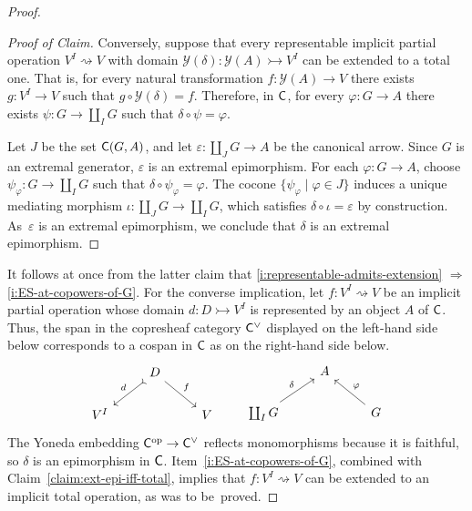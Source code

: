 \documentclass[10pt,a4paper]{amsart}
\newcommand{\CP}[1]{{#1}^{\text{\tiny$\vee$}}}			%
\newcommand{\IMP}{\Rightarrow}						%
\newcommand{\cat}{{\sf C}}								%
\renewcommand{\epsilon}{\varepsilon}
\newcommand{\op}{{\mathrm{op}}}						%
\renewcommand{\phi}{\varphi}
\newcommand{\yo}{\mathcal{Y}}
\begin{document}
\begin{proof}
\begin{proof}[Proof of Claim]
Conversely, suppose that every representable implicit partial operation $V^{I} \rightsquigarrow V$ with domain $\yo(\delta)\colon \yo(A)\rightarrowtail V^{I}$ can be extended to a total one. That is, for every natural transformation $f\colon \yo(A)\to V$ there exists $g\colon V^{I}\to V$ such that $g\circ \yo(\delta) = f$. Therefore, in $\cat$, for every $\phi\colon G\to A$ there exists $\psi\colon G\to \coprod_{I}G$ such that $\delta\circ \psi = \phi$. 

Let $J$ be the set $\cat(G,A)$, and let $\epsilon\colon \coprod_{J}G \to A$ be the canonical arrow. Since $G$ is an extremal generator, $\epsilon$ is an extremal epimorphism. For each $\phi\colon G \to A$, choose $\psi_{\phi}\colon G\to \coprod_{I}G$ such that $\delta\circ \psi_{\phi} = \phi$. The cocone $\{\psi_{\phi}\mid \phi\in J\}$ induces a unique mediating morphism $\iota\colon \coprod_{J}G \to \coprod_{I}G$, which satisfies $\delta\circ \iota = \epsilon$ by construction. As~$\epsilon$ is an extremal epimorphism, we conclude that $\delta$ is an extremal epimorphism. 
\end{proof}
%
It follows at once from the latter claim that \ref{i:representable-admits-extension} $\IMP$ \ref{i:ES-at-copowers-of-G}.
%
For the converse implication, let $f\colon V^{I}\rightsquigarrow V$ be an implicit partial operation whose domain $d\colon D\rightarrowtail V^{I}$ is represented by an object $A$ of $\cat$. 
%
Thus, the span in the copresheaf category $\CP{\cat}$ displayed on the left-hand side below corresponds to a cospan in $\cat$ as on the right-hand side below.
\begin{equation*}
\begin{tikzcd}
& D \arrow[rightarrowtail]{dl}[swap]{d} \arrow{dr}{f} & \\
V^{I} & & V
\end{tikzcd}
\ \ \ \ \ \ 
\begin{tikzcd}
& A  & \\
\coprod_{I}{G} \arrow{ur}{\delta} & & G \arrow{ul}[swap]{\phi}
\end{tikzcd}
\end{equation*}
%
The Yoneda embedding $\cat^{\op}\to \CP{\cat}$ reflects monomorphisms because it is faithful, so $\delta$ is an epimorphism in $\cat$. Item~\ref{i:ES-at-copowers-of-G}, combined with Claim~\ref{claim:ext-epi-iff-total}, implies that $f\colon V^{I}\rightsquigarrow V$ can be extended to an implicit total operation, as was to be~proved.
\end{proof}
\end{document}
